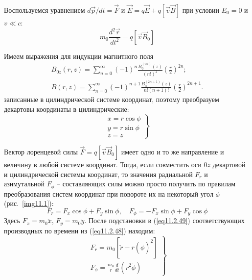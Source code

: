 
Воспользуемся уравнением \( d\vec{p}/dt = \vec{F} \) и 
\( \vec{E} = q\vec{E} + q[\vec{v}\vec{B}] \) при условии \( E_0 = 0 \) и 
\( v \ll c \):
\begin{equation}
	m_0 \frac{d^2 \vec{r}}{dt^2} = q[\vec{v}\vec{B}_0]
	\label{eq11.2.47}
\end{equation}

Имеем выражения для индукции магнитного поля 
\[
	\begin{array}{c}
		B_{0z}(r,z) = \sum\limits_{n=0}^{\infty}(-1)^n 
			\frac{B_0^{(2n)}(z)}{(n!)^2}\left(\frac{r}{2}\right)^{2n}; \\
		B(r,z) = \sum\limits_{n=0}^{\infty}(-1)^{n+1} 
			\frac{B_0^{(2n+1)}(z)}{n!(n+1)!}\left(\frac{r}{2}\right)^{2n+1}.
	\end{array}
\]
записанные в цилиндрической системе координат, поэтому преобразуем декартовы 
координаты в цилиндрические:
\begin{equation}
	\left. \begin{array}{c}
		x = r\cos\phi \\
		y = r\sin\phi \\
		z = z
	\end{array} \right\}
	\label{eq11.2.48}
\end{equation}

Вектор лоренцевой силы \( \vec{F} = q[\vec{v}\vec{B}_0] \) имеет одно и то же 
направление и величину в любой системе координат. Тогда, если совместить оси 
\( 0z \) декартовой и цилиндрической системы координат, то значения радиальной 
\( F_r \) и азимутальной \( F_\phi \) -- составляющих силы можно просто 
получить по правилам преобразования систем координат при повороте их на 
некоторый угол \( \phi \) (рис.~\ref{img11.1}):
\begin{equation}
	F_r = F_x \cos\phi + F_y \sin\phi, \quad
	F_\phi = -F_x \sin\phi + F_y \cos\phi
	\label{eq11.2.49}
\end{equation}
Здесь \( F_x = m_0 \ddot{x} \), \( F_y = m_0 \ddot{y} \). После подстановки в 
(\ref{eq11.2.49})  соответствующих производных по времени из 
(\ref{eq11.2.48}) находим:
\begin{equation}
	\left. \begin{array}{c}
		F_r = m_0 \left[ \ddot{r} - r(\dot{\phi})^2 \right] \\
		F_\phi = \frac{m_0}{r}\frac{d}{dt}\left( r^2\dot{\phi} \right)
	\end{array} \right\}
	\label{eq11.2.50}
\end{equation}

